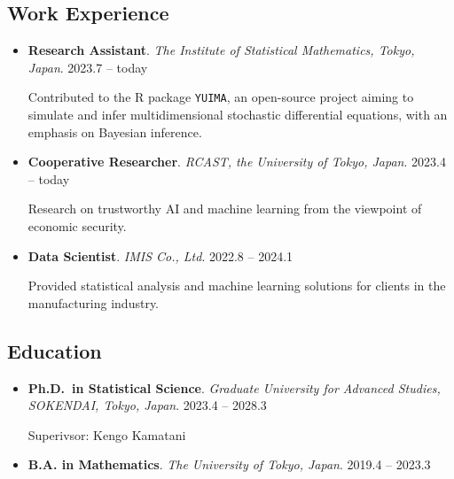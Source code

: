 \documentclass[
  11pt,
]{article}
\renewcommand{\labelitemi}{\textcolor{minty}{\faCheckCircle}} %
\begin{document}
\subsection{Work Experience}\label{work-experience}

\renewcommand{\labelitemi}{\textcolor{minty}{\faUniversity}}

\begin{itemize}
\item
  \textbf{Research Assistant}. \emph{The Institute of Statistical
  Mathematics, Tokyo, Japan}. \hfill {2023.7 -- today}

  Contributed to the R package \texttt{YUIMA}, an open-source project
  aiming to simulate and infer multidimensional stochastic differential
  equations, with an emphasis on Bayesian inference.
\item
  \textbf{Cooperative Researcher}. \emph{RCAST, the University of Tokyo,
  Japan}. \hfill {2023.4 -- today}

  Research on trustworthy AI and machine learning from the viewpoint of
  economic security.
\item
  \textbf{Data Scientist}. \emph{IMIS Co., Ltd}. \hfill {2022.8 --
  2024.1}

  Provided statistical analysis and machine learning solutions for
  clients in the manufacturing industry.
\end{itemize}

\subsection{Education}\label{education}

\renewcommand{\labelitemi}{\textcolor{minty}{\faGraduationCap}}

\begin{itemize}
\item
  \textbf{Ph.D.~in Statistical Science}. \emph{Graduate University for
  Advanced Studies, SOKENDAI, Tokyo, Japan}. \hfill {2023.4 -- 2028.3}

  Superivsor: Kengo Kamatani
\item
  \textbf{B.A. in Mathematics}. \emph{The University of Tokyo, Japan}.
  \hfill {2019.4 -- 2023.3}
\end{itemize}

\renewcommand{\labelitemi}{\textcolor{minty}{\faBookmark}}
\end{document}
